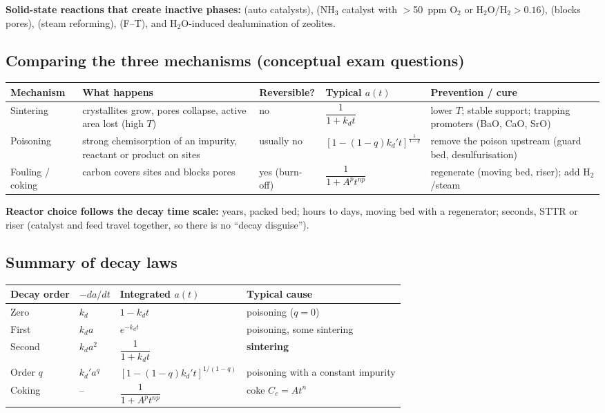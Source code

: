 \documentclass[11pt]{article}
\begin{document}
\textbf{Solid-state reactions that create inactive phases:}  (auto catalysts),
 (NH$_3$ catalyst with $>$50~ppm O$_2$ or H$_2$O/H$_2>0.16$),
 (blocks pores),  (steam reforming),
 (F--T), and H$_2$O-induced dealumination of zeolites.

\subsection{Comparing the three mechanisms (conceptual exam questions)}
\begin{center}
\small
\renewcommand{\arraystretch}{1.3}
\begin{tabular}{p{2.3cm} p{4.1cm} p{2.0cm} p{2.1cm} p{4.0cm}}
\toprule
Mechanism & What happens & Reversible? & Typical $a(t)$ & Prevention / cure\\
\midrule
Sintering & crystallites grow, pores collapse, active area lost (high $T$) & no & $\dfrac{1}{1+k_dt}$ & lower $T$; stable support; trapping promoters (BaO, CaO, SrO)\\
Poisoning & strong chemisorption of an impurity, reactant or product on sites & usually no & $[1-(1-q)k_d't]^{\frac{1}{1-q}}$ & remove the poison upstream (guard bed, desulfurisation)\\
Fouling / coking & carbon covers sites and blocks pores & yes (burn-off) & $\dfrac{1}{1+A^pt^{np}}$ & regenerate (moving bed, riser); add H$_2$/steam\\
\bottomrule
\end{tabular}
\end{center}
\textbf{Reactor choice follows the decay time scale:} years, packed bed; hours to days, moving bed with a regenerator;
seconds, STTR or riser (catalyst and feed travel together, so there is no ``decay disguise'').

\subsection{Summary of decay laws}
\begin{center}
\renewcommand{\arraystretch}{1.45}
\begin{tabular}{llll}
\toprule
Decay order & $-da/dt$ & Integrated $a(t)$ & Typical cause\\
\midrule
Zero & $k_d$ & $1-k_dt$ & poisoning ($q=0$)\\
First & $k_da$ & $e^{-k_dt}$ & poisoning, some sintering\\
Second & $k_da^2$ & $\dfrac{1}{1+k_dt}$ & \textbf{sintering}\\
Order $q$ & $k_d'a^q$ & $\left[1-(1-q)k_d't\right]^{1/(1-q)}$ & poisoning with a constant impurity\\
Coking & -- & $\dfrac{1}{1+A^pt^{np}}$ & coke $C_c=At^n$\\
\bottomrule
\end{tabular}
\end{center}
\end{document}
